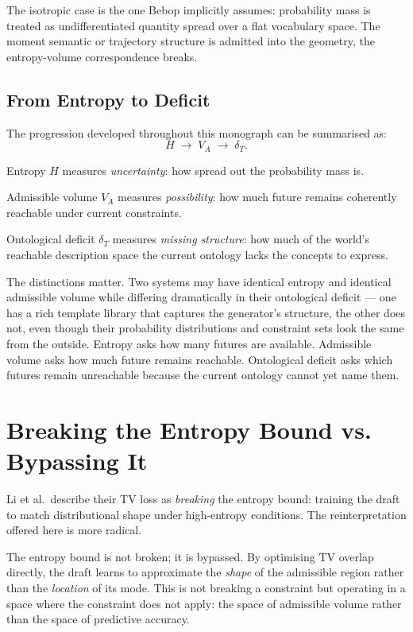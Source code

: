 \documentclass[11pt, a4paper, openany]{book}
\theoremstyle{plain}
\theoremstyle{definition}
\theoremstyle{remark}
\begin{document}
The isotropic case is the one Bebop implicitly assumes: probability mass
is treated as undifferentiated quantity spread over a flat vocabulary space.
The moment semantic or trajectory structure is admitted into the geometry,
the entropy-volume correspondence breaks.

\subsection{From Entropy to Deficit}

The progression developed throughout this monograph can be summarised as:
\[
  H \;\longrightarrow\; V_A \;\longrightarrow\; \delta_T.
\]

Entropy $H$ measures \emph{uncertainty}: how spread out the probability mass is.

Admissible volume $V_A$ measures \emph{possibility}: how much future remains
coherently reachable under current constraints.

Ontological deficit $\delta_T$ measures \emph{missing structure}: how much
of the world's reachable description space the current ontology lacks the
concepts to express.

The distinctions matter.
Two systems may have identical entropy and identical admissible volume
while differing dramatically in their ontological deficit --- one has a
rich template library that captures the generator's structure, the other
does not, even though their probability distributions and constraint sets
look the same from the outside.
Entropy asks how many futures are available.
Admissible volume asks how much future remains reachable.
Ontological deficit asks which futures remain unreachable because the
current ontology cannot yet name them.

\section{Breaking the Entropy Bound vs. Bypassing It}

Li et al.\ describe their TV loss as \emph{breaking} the entropy bound:
training the draft to match distributional shape under high-entropy conditions.
The reinterpretation offered here is more radical.

The entropy bound is not broken; it is bypassed.
By optimising TV overlap directly, the draft learns to approximate the
\emph{shape} of the admissible region rather than the \emph{location} of its
mode.
This is not breaking a constraint but operating in a space where the
constraint does not apply: the space of admissible volume rather than
the space of predictive accuracy.
\end{document}

